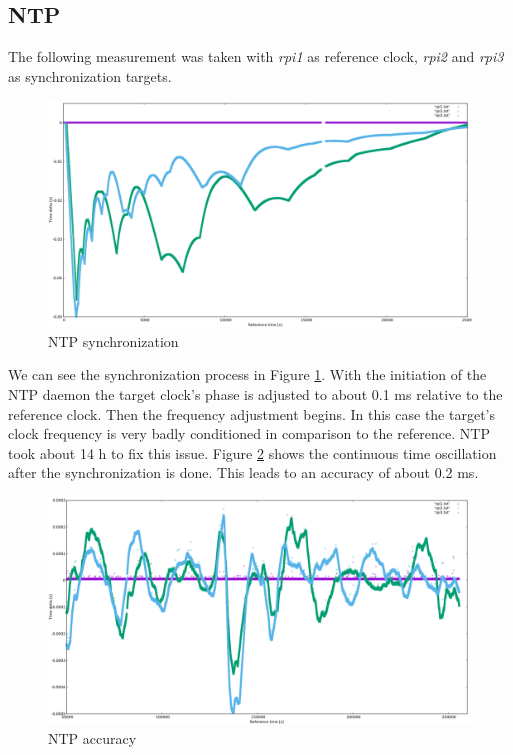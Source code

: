 \subsection{NTP}

The following measurement was taken with \textit{rpi1} as reference clock, \textit{rpi2} and \textit{rpi3} as synchronization targets.

\begin{figure}[tb]
	\centering
	\includegraphics[width=1.0\textwidth]{figures/plot_ntp1.png}
	\caption{NTP synchronization}
	\label{fig:plot_ntp1}
\end{figure}

We can see the synchronization process in Figure \ref{fig:plot_ntp1}. With the initiation of the NTP daemon the target clock's phase is adjusted to about 0.1 ms relative to the reference clock. Then the frequency adjustment begins. In this case the target's clock frequency is very badly conditioned in comparison to the reference. NTP took about 14 h to fix this issue. Figure \ref{fig:plot_ntp2} shows the continuous time oscillation after the synchronization is done. This leads to an accuracy of about 0.2 ms.

\begin{figure}[tb]
	\centering
	\includegraphics[width=1.0\textwidth]{figures/plot_ntp2.png}
	\caption{NTP accuracy}
	\label{fig:plot_ntp2}
\end{figure}

